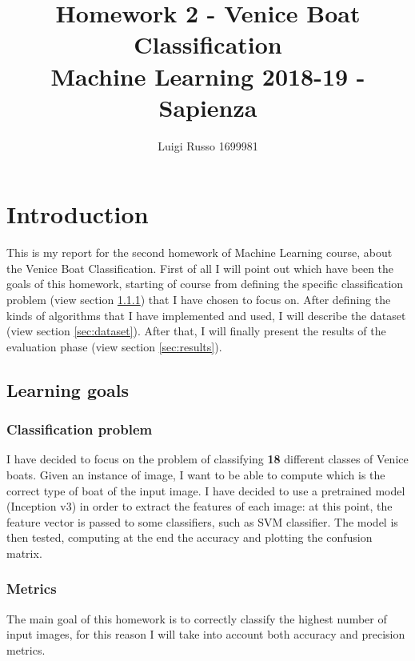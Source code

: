 \documentclass[12pt]{article}
\title{Homework 2 - Venice Boat Classification\\
	\large Machine Learning 2018-19 - Sapienza}
\author{Luigi Russo 1699981}
\begin{document}
	
\maketitle
\newpage
\tableofcontents
\newpage
\section{Introduction}
This is my report for the second homework of Machine Learning course, about the Venice Boat Classification. First of all I will point out which have been the goals of this homework, starting of course from defining the specific classification problem (view section \ref{sec:image_classification_problem}) that I have chosen to focus on. After defining the kinds of algorithms that I have implemented and used, I will describe the dataset (view section \ref{sec:dataset}). After that, I will finally present the results of the evaluation phase (view section \ref{sec:results}).

\subsection{Learning goals}
\subsubsection{Classification problem}
\label{sec:image_classification_problem}
I have decided to focus on the problem of classifying \textbf{18} different classes of Venice boats. Given an instance of image, I want to be able to compute which is the correct type of boat of the input image. I have decided to use a pretrained model (Inception v3) in order to extract the features of each image: at this point, the feature vector is passed to some classifiers, such as SVM classifier. The model is then tested, computing at the end the accuracy and plotting the confusion matrix.
\subsubsection{Metrics}
The main goal of this homework is to correctly classify the highest number of input images, for this reason I will take into account both accuracy and precision metrics.
\end{document}
